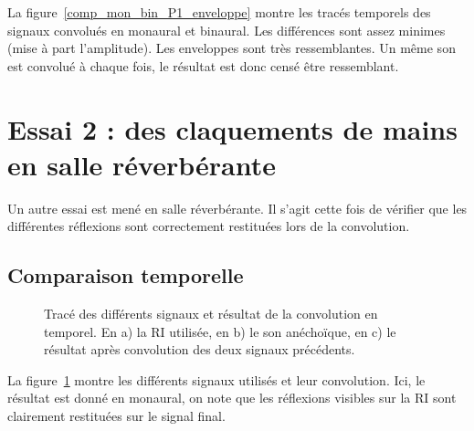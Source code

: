 La figure~\ref{comp_mon_bin_P1_enveloppe} montre les tracés temporels des signaux convolués en monaural et binaural.
Les différences sont assez minimes (mise à part l'amplitude). Les enveloppes sont très ressemblantes. Un même son est
convolué à chaque fois, le résultat est donc censé être ressemblant.

\section{Essai 2 : des claquements de mains en salle réverbérante} %

Un autre essai est mené en salle réverbérante. Il s'agit cette fois de vérifier que les différentes réflexions sont
correctement restituées lors de la convolution.

\subsection{Comparaison temporelle} %

\begin{figure}[h!]
	\caption{\label{temporel_reverb}Tracé des différents signaux et résultat de la convolution en temporel. En a) la
    RI utilisée, en b) le son anéchoïque, en c) le résultat après convolution des deux signaux précédents.}
\end{figure}

La figure~\ref{temporel_reverb} montre les différents signaux utilisés et leur convolution. Ici, le résultat est donné
en monaural, on note que les réflexions visibles sur la RI sont clairement restituées sur le signal final.


